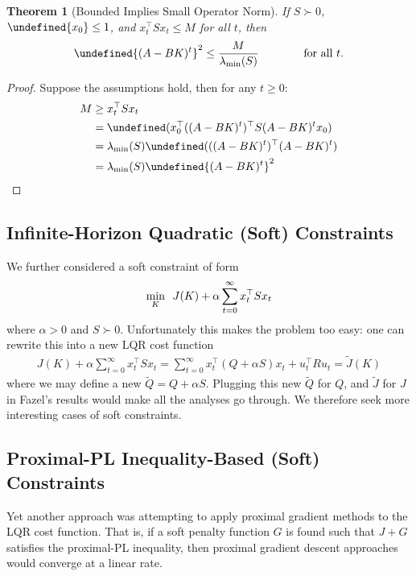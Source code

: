 \documentclass[11pt]{article}  %
\newtheorem{theorem}{Theorem}
\let\norm\undefined
\newcommand{\norm}[1]{\lVert #1 \rVert}
\let\Tr\undefined
\DeclareMathOperator{\Tr}{Tr}
\begin{document}
\begin{theorem}[Bounded Implies Small Operator Norm]
  If \(S \succ 0\), \(\norm{x_0} \leq 1\),
  and \(x_t ^\top S x_t \leq M\) for all \(t\),
  then
  \begin{align}
    \norm{(A - BK)^t} ^2 \leq \frac{M}{\lambda_{\min} (S)}
    \qquad
    \qquad
    \text{for all \(t\).}
  \end{align}
\end{theorem}
\begin{proof}
  Suppose the assumptions hold, then for any \(t \geq 0\):
  \begin{align*}
    M &\geq x_t ^ \top S x_t \\
      &= \Tr (x_0 ^\top ((A - BK)^t) ^\top S (A - BK)^t x_0) \\
      &= \lambda_{\min} (S) \Tr( ((A - BK)^t)^\top (A - BK)^t) \\
      &= \lambda_{\min} (S) \norm{(A - BK)^t}^2
  \end{align*}
\end{proof}


\subsection{Infinite-Horizon Quadratic (Soft) Constraints}
We further considered a soft constraint of form
\begin{align}
  \min_{K} \enskip J(K) + \alpha \sum_{t = 0}^{\infty} x_t ^\top S x_t
\end{align}
where \(\alpha > 0\) and \(S \succ 0\).
Unfortunately this makes the problem too easy:
one can rewrite this into a new LQR cost function
\begin{align}
  J(K) + \alpha \sum_{t = 0}^{\infty} x_t ^\top S x_t
    = \sum_{t = 0}^{\infty} x_t ^\top (Q + \alpha S) x_t + u_t ^\top R u_t
    = \tilde{J} (K)
\end{align}
where we may define a new \(\tilde{Q} = Q + \alpha S\).
Plugging this new \(\tilde{Q}\) for \(Q\), and \(\tilde{J}\) for \(J\)
in Fazel's results would 
make all the analyses go through.
We therefore seek more interesting cases of soft constraints.


\subsection{Proximal-PL Inequality-Based (Soft) Constraints}

Yet another approach was attempting to apply proximal gradient methods to
the LQR cost function.
That is, if a soft penalty function \(G\) is found such that
\(J + G\)
satisfies the proximal-PL inequality,
then proximal gradient descent approaches would converge at a linear rate.
\end{document}
